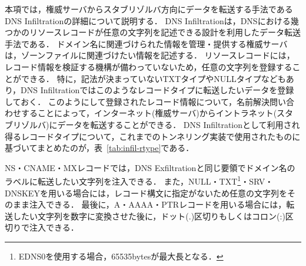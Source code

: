 本項では，権威サーバからスタブリゾルバ方向にデータを転送する手法であるDNS Infiltrationの詳細について説明する．
DNS Infiltrationは，DNSにおける幾つかのリソースレコードが任意の文字列を記述できる設計を利用したデータ転送手法である．
ドメイン名に関連づけられた情報を管理・提供する権威サーバは，ゾーンファイルに関連づけたい情報を記述する．
リソースレコードには，レコード情報を検証する機構が備わっていないため，任意の文字列を登録することができる．
特に，記法が決まっていないTXTタイプやNULLタイプなどもあり，DNS Infiltrationではこのようなレコードタイプに転送したいデータを登録しておく．
このようにして登録されたレコード情報について，名前解決問い合わせすることによって，インターネット(権威サーバ)からイントラネット(スタブリゾルバ)にデータを転送することができる．
DNS Infiltrationとして利用され得るレコードタイプについて，これまでのトンネリング実装で使用されたものに基づいてまとめたのが，表~\ref{tab:infil-rtype}である．



\newpage
NS・CNAME・MXレコードでは，DNS Exfiltrationと同じ要領でドメイン名のラベルに転送したい文字列を注入できる．
また，NULL・TXT\footnote{EDNS0を使用する場合，65535bytesが最大長となる．}・SRV・DNSKEYを用いる場合には，レコード構文に指定がないため任意の文字列をそのまま注入できる．
最後に，A・AAAA・PTRレコードを用いる場合には，転送したい文字列を数字に変換させた後に，ドット(.)区切りもしくはコロン(:)区切りで注入できる．

